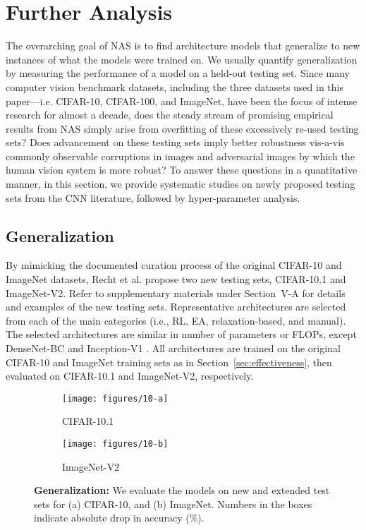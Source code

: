 \documentclass[journal]{IEEEtran}
\theoremstyle{definition}
\theoremstyle{remark}
\begin{document}
 \section{Further Analysis\label{sec:analysis}}
The overarching goal of NAS is to find architecture models that generalize to new instances of what the models were trained on. We usually quantify generalization by measuring the performance of a model on a held-out testing set. Since many computer vision benchmark datasets, including the three datasets used in this paper---i.e. CIFAR-10, CIFAR-100, and ImageNet, have been the focus of intense research for almost a decade, does the steady stream of promising empirical results from NAS simply arise from overfitting of these excessively re-used testing sets? Does advancement on these testing sets imply better robustness vis-a-vis commonly observable corruptions in images and adversarial images by which the human vision system is more robust? To answer these questions in a quantitative manner, in this section, we provide systematic studies on newly proposed testing sets from the CNN literature, followed by hyper-parameter analysis.

\vspace{-2mm}
\subsection{Generalization}
By mimicking the documented curation process of the original CIFAR-10 and ImageNet datasets, Recht et al. \cite{recht2019imagenet} propose two new testing sets, CIFAR-10.1 and ImageNet-V2. Refer to supplementary materials under Section~V-A for details and examples of the new testing sets. Representative architectures are selected from each of the main categories (i.e., RL, EA, relaxation-based, and manual). The selected architectures are similar in number of parameters or FLOPs, except DenseNet-BC \cite{densenet} and Inception-V1 \cite{googlenet}. All architectures are trained on the original CIFAR-10 and ImageNet training sets as in Section~\ref{sec:effectiveness}, then evaluated on CIFAR-10.1 and ImageNet-V2, respectively.

\begin{figure}[t]
	\centering
	\begin{subfigure}[t]{.24\textwidth}
		\centering
		\texttt{[image: figures/10-a]}
		\caption{CIFAR-10.1\label{fig:cifar10_generalization}}
	\end{subfigure}
	\begin{subfigure}[t]{.24\textwidth}
		\centering
		\texttt{[image: figures/10-b]}
		\caption{ImageNet-V2\label{fig:imagenet_generalization}}
	\end{subfigure}
	\caption{\textbf{Generalization:} We evaluate the models on new and extended test sets for (a) CIFAR-10, and (b) ImageNet. Numbers in the boxes indicate absolute drop in accuracy (\%).
	\label{fig:generalization}\vspace{-0.3cm}}
\end{figure}
\end{document}
